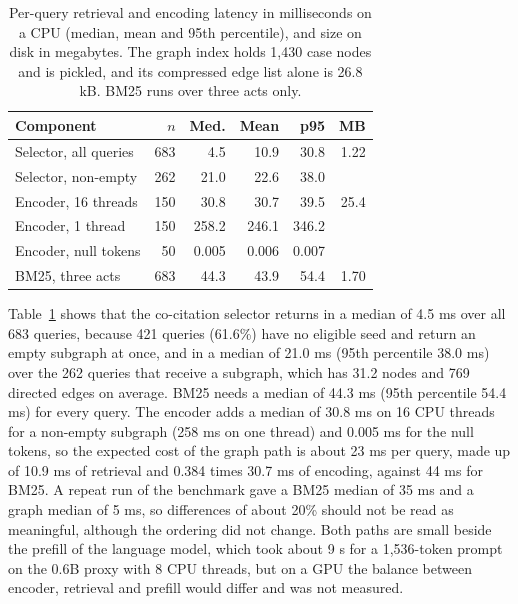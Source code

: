\documentclass[journal]{IEEEtran}
\begin{document}
\begin{table}[!t]\centering\footnotesize
\setlength{\tabcolsep}{3pt}
\caption{Per-query retrieval and encoding latency in milliseconds on a CPU (median, mean and 95th percentile), and size on disk in megabytes. The graph index holds 1,430 case nodes and is pickled, and its compressed edge list alone is 26.8 kB. BM25 runs over three acts only.}\label{tab:latency}
\begin{tabular}{@{}lrrrrr@{}}\toprule
Component & $n$ & Med. & Mean & p95 & MB\\\midrule
Selector, all queries & 683 & 4.5 & 10.9 & 30.8 & 1.22\\
Selector, non-empty & 262 & 21.0 & 22.6 & 38.0 & \\
Encoder, 16 threads & 150 & 30.8 & 30.7 & 39.5 & 25.4\\
Encoder, 1 thread & 150 & 258.2 & 246.1 & 346.2 & \\
Encoder, null tokens & 50 & 0.005 & 0.006 & 0.007 & \\
BM25, three acts & 683 & 44.3 & 43.9 & 54.4 & 1.70\\\bottomrule
\end{tabular}\end{table}

Table~\ref{tab:latency} shows that the co-citation selector returns in a median of 4.5 ms over all 683 queries, because 421 queries (61.6\%) have no eligible seed and return an empty subgraph at once, and in a median of 21.0 ms (95th percentile 38.0 ms) over the 262 queries that receive a subgraph, which has 31.2 nodes and 769 directed edges on average. BM25 needs a median of 44.3 ms (95th percentile 54.4 ms) for every query. The encoder adds a median of 30.8 ms on 16 CPU threads for a non-empty subgraph (258 ms on one thread) and 0.005 ms for the null tokens, so the expected cost of the graph path is about 23 ms per query, made up of 10.9 ms of retrieval and 0.384 times 30.7 ms of encoding, against 44 ms for BM25. A repeat run of the benchmark gave a BM25 median of 35 ms and a graph median of 5 ms, so differences of about 20\% should not be read as meaningful, although the ordering did not change. Both paths are small beside the prefill of the language model, which took about 9 s for a 1,536-token prompt on the 0.6B proxy with 8 CPU threads, but on a GPU the balance between encoder, retrieval and prefill would differ and was not measured.
\end{document}
